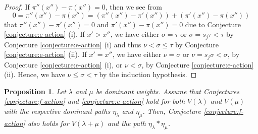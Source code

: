 \documentclass[final]{amsart}
\theoremstyle{plain}
\newtheorem{proposition}[corollary]{Proposition}
\theoremstyle{definition}
\begin{document}
\begin{proof}
    If $\pi''(x'') - \pi(x'') = 0$, then we see from
    \[
        0 = \pi''(x'') - \pi(x'') = (\pi''(x'') - \pi'(x'')) + (\pi'(x'') - \pi(x''))
    \]
    that $\pi''(x'') - \pi'(x'') = 0$ and $\pi'(x'') - \pi(x'') = 0$ due to Conjecture \ref{conjecture:e-action} (i).
    If $x' > x''$, we have either $\sigma = \tau$ or $\sigma = s_j\tau < \tau$ by Conjecture \ref{conjecture:e-action} (i) and thus $\nu < \sigma \le \tau$ by Conjecture \ref{conjecture:e-action} (ii).
    If $x' = x''$, we have either $\nu = \sigma$ or $\nu = s_j\sigma < \sigma$, by Conjecture \ref{conjecture:e-action} (i), or $\nu < \sigma$, by Conjecture \ref{conjecture:e-action} (ii).
    Hence, we have $\nu \le \sigma < \tau$ by the induction hypothesis.
\end{proof}

\begin{proposition}
    \label{proposition:left-action-tensor-product}
    Let $\lambda$ and $\mu$ be dominant weights.
    Assume that Conjectures \ref{conjecture:f-action} and \ref{conjecture:e-action} hold for both $V(\lambda)$ and $V(\mu)$ with the respective dominant paths $\eta_\lambda$ and $\eta_\mu$.
    Then, Conjecture \ref{conjecture:f-action} also holds for $V(\lambda + \mu)$ and the path $\eta_\lambda * \eta_\mu$.
\end{proposition}
\end{document}

